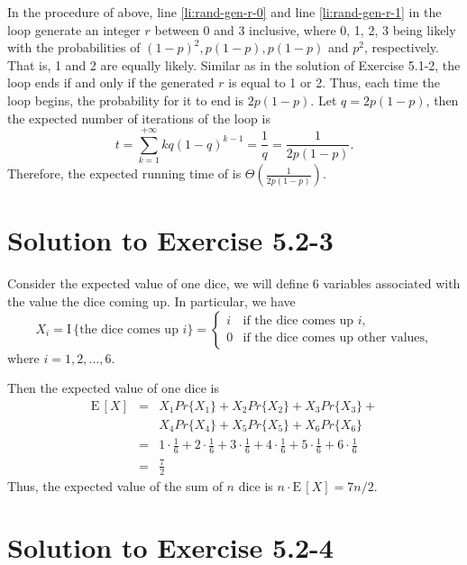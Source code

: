 \documentclass[a4paper, fleqn]{article}
\begin{document}
In the procedure of  above, line \ref{li:rand-gen-r-0} and line
\ref{li:rand-gen-r-1} in the  loop generate an integer $r$ between 0
and 3 inclusive, where 0, 1, 2, 3 being likely with the probabilities of
$(1 - p)^2, p(1 - p), p(1 - p)$ and $p^2$, respectively. That is, 1 and 2 are
equally likely. Similar as in the solution of Exercise 5.1-2, the 
loop ends if and only if the generated $r$ is equal to 1 or 2. Thus, each time
the  loop begins, the probability for it to end is $2p(1 - p)$. Let
$q = 2p(1 - p)$, then the expected number of iterations of  the  loop is
\[
t = \sum_{k = 1}^{+\infty} kq(1 - q)^{k - 1} = \frac{1}{q} = \frac{1}{2p(1 - p)}.
\]
Therefore, the expected running time of  is
$\Theta(\frac{1}{2p(1 - p)})$.

\section*{Solution to Exercise 5.2-3}

Consider the expected value of one dice, we will define 6 variables associated
with the value the dice coming up. In particular, we have
\[
X_i = \mbox{I}\,\{\mbox{the dice comes up } i\} = \left\{ \begin{array}{ll}
      i & \mbox{if the dice comes up } i, \\
      0 & \mbox{if the dice comes up other values},
      \end{array} \right.
\]
where $i = 1, 2,\ldots, 6$.

Then the expected value of one dice is
\begin{eqnarray*}
\mbox{E}\,[X] & = & X_1 Pr\{X_1\} + X_2 Pr\{X_2\} + X_3 Pr\{X_3\} + \\
            &   & X_4 Pr\{X_4\} + X_5 Pr\{X_5\} + X_6 Pr\{X_6\} \\
  & = & 1 \cdot \frac{1}{6} + 2 \cdot \frac{1}{6} + 3 \cdot \frac{1}{6} +
        4 \cdot \frac{1}{6} + 5 \cdot \frac{1}{6} + 6 \cdot \frac{1}{6} \\
  & = & \frac{7}{2}
\end{eqnarray*}
Thus, the expected value of the sum of $n$ dice is $n \cdot \mbox{E}\,[X] = 7n/2$.





\section*{Solution to Exercise 5.2-4}
\end{document}
